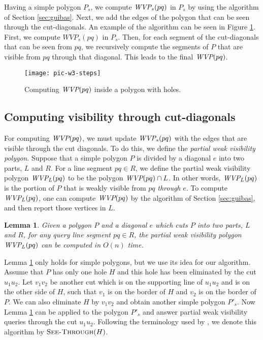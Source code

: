 \documentclass[5p]{elsarticle}
\newtheorem{lemma}[theorem]{Lemma}
\def\WVP{\mbox{\it{WVP}}}
\def\P{\mbox{${P}$}}
\def\SeeThrough{\mbox{\textsc{See-Through}}}
\begin{document}
Having a simple polygon $\P_s$, we compute $\WVP_s(pq)$ in $\P_s$ by using
the algorithm of Section \ref{sec:guibas}.
Next, we add the edges of the polygon that can be seen through the cut-diagonals.
An example of the algorithm can be seen in Figure \ref{fig:w3-steps}.
First, we compute $WVP_s(pq)$ in $\P_s$. Then, for each segment of the cut-diagonals
that can be seen from $pq$, we recursively compute the segments of $\P$ that are visible 
from $pq$ through that diagonal. This leads to the final $\WVP(pq)$.

\begin{figure}[h]
  \centering
  \texttt{[image: pic-w3-steps]} 
  \caption{ Computing $\WVP(pq)$ inside a polygon with holes.}
  \label{fig:w3-steps}
\end{figure}


\subsection{Computing visibility through cut-diagonals}
\label{sec:alg:cuts}


For computing $\WVP(pq)$, we must update $\WVP_s(pq)$ with the edges that 
are visible through the cut diagonals. 
To do this, we define the {\em partial weak visibility polygon}.
Suppose that a simple polygon $\P$ is divided by a diagonal $e$ into two parts, $L$ and $R$.
For a line segment $pq \in R$, we define the partial weak visibility polygon
$\WVP_{L}(pq)$ to be the polygon $\WVP(pq) \cap L$.
In other words, $\WVP_L(pq)$ is the portion of $\P$ that is weakly visible from $pq$ {\em through} $e$.
To compute $\WVP_L(pq)$, one can compute $\WVP(pq)$ by the algorithm of Section \ref{sec:guibas}, 
and then report those vertices in $L$. 



\begin{lemma} 
\label{lemma:partial}
Given a polygon $\P$ and a diagonal $e$ which cuts $\P$ into two parts,
$L$ and $R$, for any query line segment $pq \in R$, the partial weak visibility
polygon $\WVP_L(pq)$ can be computed in $O(n)$ time.
\end{lemma}




Lemma \ref{lemma:partial} only holds for simple polygons, but we use its idea 
for our algorithm. Assume that $\P$ has only one hole $H$ and this hole has been eliminated 
by the cut $u_1u_2$. 
Let $v_1v_2$ be another cut which is on the supporting line of $u_1u_2$ and is on the
other side of $H$,  such that $v_1$ is on the border of $H$ and $v_2$ is on the border of $\P$.
We can also eliminate $H$ by $v_1v_2$ and obtain another simple polygon $\P'_s$. 
Now Lemma \ref{lemma:partial} can be applied to the polygon $\P'_s$ and
answer partial weak visibility queries through the cut $u_1u_2$. Following the terminology 
used by \cite{zarei}, we denote this algorithm by $\SeeThrough(H)$. 
\end{document}
